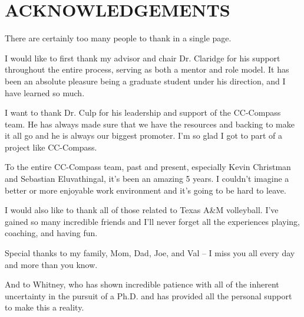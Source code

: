 %
%
%


\chapter*{\texorpdfstring{\MakeUppercase{ACKNOWLEDGEMENTS}}{ACKNOWLEDGEMENTS}}


There are certainly too many people to thank in a single page.

I would like to first thank my advisor and chair Dr. Claridge for his
support throughout the entire process, serving as both a mentor and role
model. It has been an absolute pleasure being a graduate student under
his direction, and I have learned so much. 

I want to thank Dr. Culp for his leadership and support of the CC-Compass team.
He has always made sure that we have the resources and backing to make
it all go and he is always our biggest promoter. I'm so glad I got to part
of a project like CC-Compass.

To the entire CC-Compass team, past and present, especially Kevin
Christman and Sebastian Eluvathingal, it's been an amazing 5 years. I
couldn't imagine a better or more enjoyable work environment and it's
going to be hard to leave. 

I would also like to thank all of those related to Texas A\&M
volleyball. I've gained so many incredible friends and I'll never forget
all the experiences playing, coaching, and having fun. 

Special thanks to my family, Mom, Dad, Joe, and Val -- I miss you all
every day and more than you know.

And to Whitney, who has shown incredible patience with all of the
inherent uncertainty in the pursuit of a Ph.D. and has provided all the
personal support to make this a reality.

\pagebreak{}
